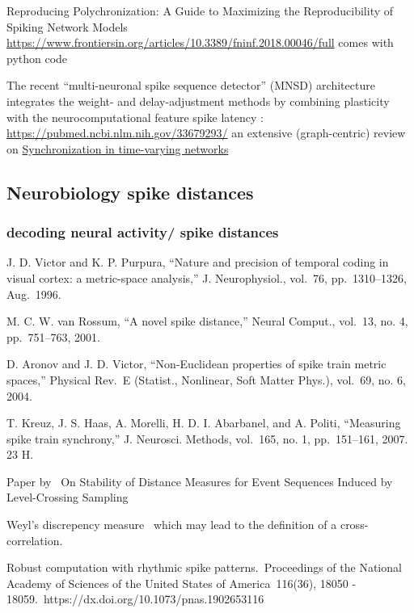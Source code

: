 \documentclass[brainsci, %
               review,submit,pdftex,moreauthors]{Definitions/mdpi}
\begin{document}
Reproducing Polychronization: A Guide to Maximizing the Reproducibility of Spiking Network Models \url{https://www.frontiersin.org/articles/10.3389/fninf.2018.00046/full}     comes with python code

  
    The recent ``multi-neuronal spike sequence detector'' (MNSD) architecture integrates the weight- and delay-adjustment methods by combining plasticity with the neurocomputational feature spike latency : \url{https://pubmed.ncbi.nlm.nih.gov/33679293/}
    an extensive (graph-centric) review on \href{https://arxiv.org/abs/2109.07618}{Synchronization in time-varying networks}


\subsection{Neurobiology spike distances}
\subsubsection{decoding neural activity/ spike distances}

J. D. Victor and K. P. Purpura, ``Nature and precision of temporal coding in visual cortex: a metric-space analysis,'' J. Neurophysiol., vol.~76, pp.~1310--1326, Aug.~1996.

M. C. W. van Rossum, ``A novel spike distance,'' Neural Comput., vol.~13, no. 4, pp.~751--763, 2001. 

D. Aronov and J. D. Victor, ``Non-Euclidean properties of spike train metric spaces,'' Physical Rev.~E (Statist., Nonlinear, Soft Matter Phys.), vol.~69, no. 6, 2004.

T. Kreuz, J. S. Haas, A. Morelli, H. D. I. Abarbanel, and A. Politi, ``Measuring spike train synchrony,'' J. Neurosci. Methods, vol.~165, no. 1, pp.~151--161, 2007. 23 H.

Paper by~\citep{moser_stability_2014} On Stability of Distance Measures for Event Sequences Induced by Level-Crossing Sampling

Weyl's discrepency measure~\citep{weyl_ber_1916} which may lead to the definition of a cross-correlation.

Robust computation with rhythmic spike patterns.~Proceedings of the National Academy of Sciences of the United States of America~116(36), 18050 - 18059.~https://dx.doi.org/10.1073/pnas.1902653116
\end{document}
